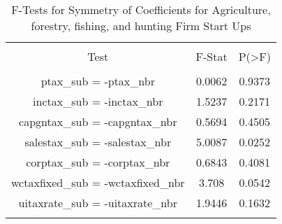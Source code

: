 
\begin{table}[!htbp] \centering 
  \caption{F-Tests for Symmetry of Coefficients for Agriculture, forestry, fishing, and hunting Firm Start Ups} 
  \label{11Ftests} 
\begin{tabular}{@{\extracolsep{5pt}} ccc} 
\\[-1.8ex]\hline 
\hline \\[-1.8ex] 
Test & F-Stat & P(\textgreater F) \\ 
\hline \\[-1.8ex] 
ptax\_sub = -ptax\_nbr & 0.0062 & 0.9373 \\ 
inctax\_sub = -inctax\_nbr & 1.5237 & 0.2171 \\ 
capgntax\_sub = -capgntax\_nbr & 0.5694 & 0.4505 \\ 
salestax\_sub = -salestax\_nbr & 5.0087 & 0.0252 \\ 
corptax\_sub = -corptax\_nbr & 0.6843 & 0.4081 \\ 
wctaxfixed\_sub = -wctaxfixed\_nbr & 3.708 & 0.0542 \\ 
uitaxrate\_sub = -uitaxrate\_nbr & 1.9446 & 0.1632 \\ 
\hline \\[-1.8ex] 
\end{tabular} 
\end{table} 
